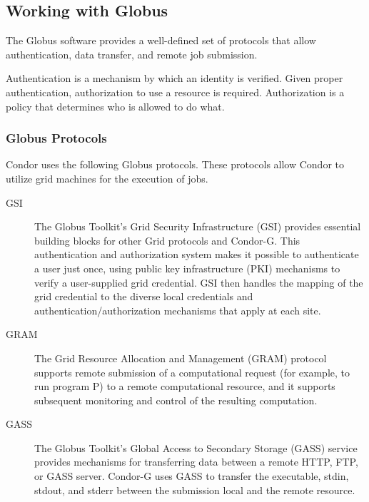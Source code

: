 \subsection{\label{sec:Globus-intro}Working with Globus}

The Globus software provides a well-defined set of protocols
that allow authentication, data transfer, and remote job submission.

Authentication is a mechanism by which an identity is verified.
Given proper authentication, authorization to use a resource
is required.
Authorization is a policy that determines who is allowed to do what. 


\subsubsection{\label{sec:Globus-Protocols}Globus Protocols}
Condor uses the following Globus protocols.
These protocols allow Condor to utilize grid machines for
the execution of jobs.
\begin{description}
\item[GSI]
The Globus Toolkit's Grid Security Infrastructure (GSI) provides essential
building blocks for other Grid protocols and Condor-G.
This authentication and authorization system
makes it possible to authenticate a user just once,
using public key infrastructure (PKI) mechanisms to verify
a user-supplied grid credential.
GSI then handles the mapping of the grid credential to the
diverse local credentials and authentication/authorization mechanisms that
apply at each site. 
\item[GRAM]
The Grid Resource Allocation and Management (GRAM) protocol supports remote
submission of a computational request (for example, to run program P)
to a remote computational resource,
and it supports subsequent monitoring and control of the resulting
computation. 
\item[GASS]
The Globus Toolkit's Global Access to Secondary Storage (GASS) service provides
mechanisms for transferring data between a remote HTTP, FTP, or GASS server. 
Condor-G uses GASS to transfer the executable, stdin, stdout, and stderr
between the submission local and the remote resource.
\end{description}

